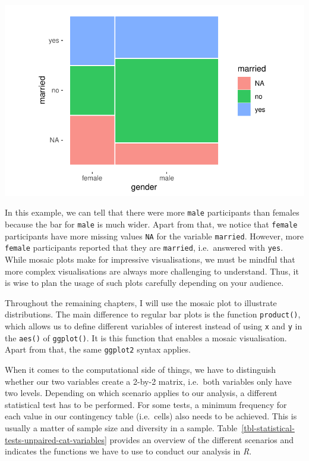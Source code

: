 \documentclass[
  letterpaper,
  DIV=11,
  numbers=noendperiod]{scrreprt}
\begin{document}
\includegraphics{11_group_comparison_files/figure-pdf/mosaic-plot-gender-married-plot-1.pdf}

In this example, we can tell that there were more \texttt{male}
participants than females because the bar for \texttt{male} is much
wider. Apart from that, we notice that \texttt{female} participants have
more missing values \texttt{NA} for the variable \texttt{married}.
However, more \texttt{female} participants reported that they are
\texttt{married}, i.e.~answered with \texttt{yes}. While mosaic plots
make for impressive visualisations, we must be mindful that more complex
visualisations are always more challenging to understand. Thus, it is
wise to plan the usage of such plots carefully depending on your
audience.

Throughout the remaining chapters, I will use the mosaic plot to
illustrate distributions. The main difference to regular bar plots is
the function \texttt{product()}, which allows us to define different
variables of interest instead of using \texttt{x} and \texttt{y} in the
\texttt{aes()} of \texttt{ggplot()}. It is this function that enables a
mosaic visualisation. Apart from that, the same \texttt{ggplot2} syntax
applies.

When it comes to the computational side of things, we have to
distinguish whether our two variables create a 2-by-2 matrix, i.e.~both
variables only have two levels. Depending on which scenario applies to
our analysis, a different statistical test has to be performed. For some
tests, a minimum frequency for each value in our contingency table
(i.e.~cells) also needs to be achieved. This is usually a matter of
sample size and diversity in a sample.
Table~\ref{tbl-statistical-tests-unpaired-cat-variables} provides an
overview of the different scenarios and indicates the functions we have
to use to conduct our analysis in \emph{R}.
\end{document}
